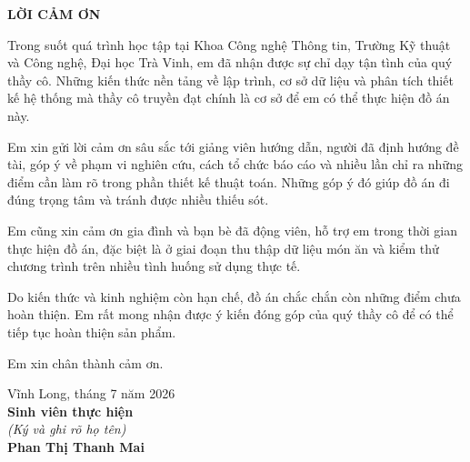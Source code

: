 \clearpage
\thispagestyle{empty}
\begin{center}
{\fontsize{14}{21}\selectfont\bfseries LỜI CẢM ƠN}
\end{center}

\vspace{0.4cm}

Trong suốt quá trình học tập tại Khoa Công nghệ Thông tin, Trường Kỹ thuật và
Công nghệ, Đại học Trà Vinh, em đã nhận được sự chỉ dạy tận tình của quý thầy cô.
Những kiến thức nền tảng về lập trình, cơ sở dữ liệu và phân tích thiết kế hệ
thống mà thầy cô truyền đạt chính là cơ sở để em có thể thực hiện đồ án này.

Em xin gửi lời cảm ơn sâu sắc tới giảng viên hướng dẫn, người đã định hướng đề
tài, góp ý về phạm vi nghiên cứu, cách tổ chức báo cáo và nhiều lần chỉ ra những
điểm cần làm rõ trong phần thiết kế thuật toán. Những góp ý đó giúp đồ án đi
đúng trọng tâm và tránh được nhiều thiếu sót.

Em cũng xin cảm ơn gia đình và bạn bè đã động viên, hỗ trợ em trong thời gian
thực hiện đồ án, đặc biệt là ở giai đoạn thu thập dữ liệu món ăn và kiểm thử
chương trình trên nhiều tình huống sử dụng thực tế.

Do kiến thức và kinh nghiệm còn hạn chế, đồ án chắc chắn còn những điểm chưa
hoàn thiện. Em rất mong nhận được ý kiến đóng góp của quý thầy cô để có thể tiếp
tục hoàn thiện sản phẩm.

Em xin chân thành cảm ơn.

\vspace{1.2cm}
\begin{flushright}
\begin{minipage}{7.6cm}
\centering
Vĩnh Long, tháng 7 năm 2026\\[4pt]
\textbf{Sinh viên thực hiện}\\
\textit{(Ký và ghi rõ họ tên)}\\[2.2cm]
\textbf{Phan Thị Thanh Mai}
\end{minipage}
\end{flushright}
